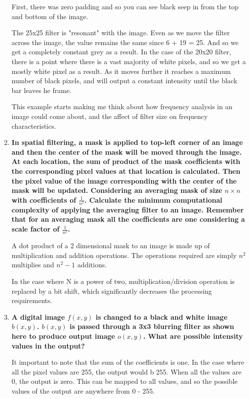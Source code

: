 \begin{enumerate}[font=\bfseries]
    First, there was zero padding and so you can see black seep in from the top
    and bottom of the image.

    The 25x25 filter is "resonant" with the image. Even as we move the filter
    across the image, the value remains the same since 6 + 19 = 25. And so we
    get a completely constant grey as a result. In the case of the 20x20 filter,
    there is a point where there is a vast majority of white pixels, and so we
    get a mostly white pixel as a result. As it moves further it reaches a
    maximum number of black pixels, and will output a constant intensity until
    the black bar leaves he frame. 

    This example starts making me think about how frequency analysis in an image
    could come about, and the affect of filter size on frequency
    characteristics.

    \item \textbf{In spatial filtering, a mask is applied to top-left corner of
    an image and then the center of the mask will be moved through the image. At
    each location, the sum of product of the mask coefficients with the
    corresponding pixel values at that location is calculated. Then the pixel
    value of the image corresponding with the center of the mask will be
    updated. Considering an averaging mask of size $n\times n$with coefficients
    of $\frac{1}{n^2}$.  Calculate the minimum computational complexity of
    applying the averaging filter to an image.  Remember that for an averaging
    mask all the coefficients are one considering a scale factor of
    $\frac{1}{n^2}$.}

    A dot product of a 2 dimensional mask to an image is made up of
    multiplication and addition operations. The operations required are simply
    $n^2$ multiplies and $n^2 - 1$ additions.

    In the case where N is a power of two, multiplication/division operation is
    replaced by a bit shift, which significantly decreases the processing
    requirements.

    \item \textbf{A digital image $f(x,y)$ is  changed to a  black and white
    image $b(x,y)$.  $b(x,y)$ is passed through a 3x3 blurring filter as shown
    here to produce output image $o(x,y)$. What are possible intensity values in
    the output?}

    It important to note that the sum of the coefficients is one. In the case
    where all the pixel values are 255, the output would b 255. When all the
    values are 0, the output is zero. This can be mapped to all values, and so
    the possible values of the output are anywhere from 0 - 255.

\end{enumerate}

